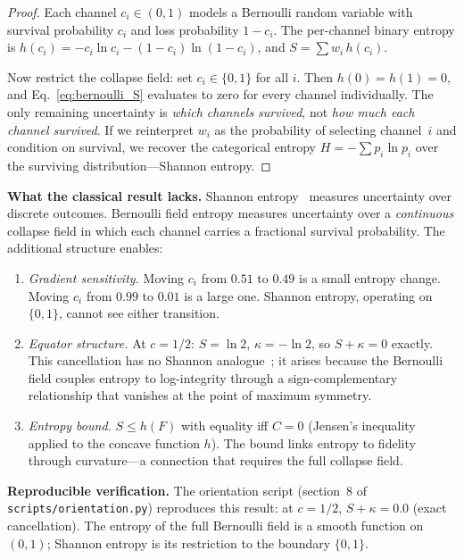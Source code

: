 \documentclass[
  aps,
  prd,
  twocolumn,
  superscriptaddress,
  nofootinbib,
  floatfix
]{revtex4-2}
\begin{document}
\begin{proof}
Each channel $c_i \in (0,1)$ models a Bernoulli random
variable with survival probability $c_i$ and loss
probability $1 - c_i$.  The per-channel binary entropy is
$h(c_i) = -c_i \ln c_i - (1{-}c_i)\ln(1{-}c_i)$, and
$S = \sum w_i\, h(c_i)$.

Now restrict the collapse field: set $c_i \in \{0, 1\}$ for
all $i$.  Then $h(0) = h(1) = 0$, and Eq.~\ref{eq:bernoulli_S}
evaluates to zero for every channel individually.  The only
remaining uncertainty is \emph{which channels survived}, not
\emph{how much each channel survived}.  If we reinterpret
$w_i$ as the probability of selecting channel~$i$ and condition
on survival, we recover the categorical entropy
$H = -\sum p_i \ln p_i$ over the surviving
distribution---Shannon entropy.
\end{proof}

\noindent\textbf{What the classical result lacks.}
Shannon entropy~\cite{shannon1948,cover2006elements} measures
uncertainty over discrete outcomes.  Bernoulli field entropy
measures uncertainty over a \emph{continuous} collapse field
in which each channel carries a fractional survival probability.
The additional structure enables:
\begin{enumerate}[leftmargin=*,label=(\alph*)]
\item \emph{Gradient sensitivity.}  Moving $c_i$ from $0.51$
  to $0.49$ is a small entropy change.  Moving $c_i$ from
  $0.99$ to $0.01$ is a large one.  Shannon entropy, operating
  on $\{0,1\}$, cannot see either transition.
\item \emph{Equator structure.}  At $c = 1/2$:
  $S = \ln 2$, $\kappa = -\ln 2$, so $S + \kappa = 0$ exactly.
  This cancellation has no Shannon analogue~\cite{shannon1948};
  it arises because the Bernoulli field couples entropy to
  log-integrity through a sign-complementary relationship that
  vanishes at the point of maximum symmetry.
\item \emph{Entropy bound.}  $S \leq h(F)$ with equality iff
  $C = 0$ (Jensen's inequality applied to the concave function
  $h$).  The bound links entropy to fidelity through curvature---a
  connection that requires the full collapse field.
\end{enumerate}

\noindent\textbf{Reproducible verification.}
The orientation script (section~8 of
\texttt{scripts/orientation.py}) reproduces this result: at
$c = 1/2$, $S + \kappa = 0.0$ (exact cancellation).  The
entropy of the full Bernoulli field is a smooth function on
$(0,1)$; Shannon entropy is its restriction to the boundary
$\{0,1\}$.
\end{document}
